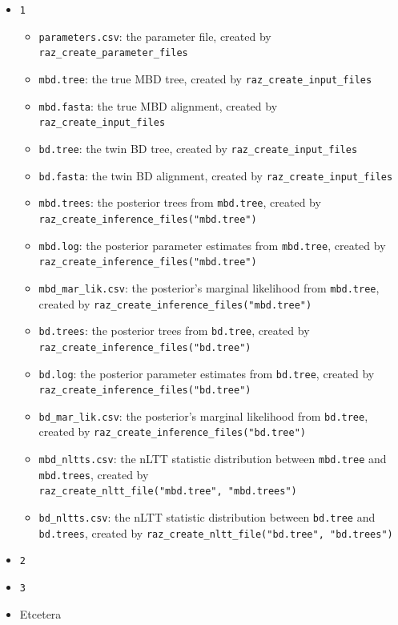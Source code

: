 \documentclass[]{article}
\providecommand{\tightlist}{%
  \setlength{\itemsep}{0pt}\setlength{\parskip}{0pt}}
\begin{document}
\begin{itemize}
\tightlist
\item
  \texttt{1}

  \begin{itemize}
  \tightlist
  \item
    \texttt{parameters.csv}: the parameter file, created by
    \texttt{raz\_create\_parameter\_files}
  \item
    \texttt{mbd.tree}: the true MBD tree, created by
    \texttt{raz\_create\_input\_files}
  \item
    \texttt{mbd.fasta}: the true MBD alignment, created by
    \texttt{raz\_create\_input\_files}
  \item
    \texttt{bd.tree}: the twin BD tree, created by
    \texttt{raz\_create\_input\_files}
  \item
    \texttt{bd.fasta}: the twin BD alignment, created by
    \texttt{raz\_create\_input\_files}
  \item
    \texttt{mbd.trees}: the posterior trees from \texttt{mbd.tree},
    created by \texttt{raz\_create\_inference\_files("mbd.tree")}
  \item
    \texttt{mbd.log}: the posterior parameter estimates from
    \texttt{mbd.tree}, created by
    \texttt{raz\_create\_inference\_files("mbd.tree")}
  \item
    \texttt{mbd\_mar\_lik.csv}: the posterior's marginal likelihood from
    \texttt{mbd.tree}, created by
    \texttt{raz\_create\_inference\_files("mbd.tree")}
  \item
    \texttt{bd.trees}: the posterior trees from \texttt{bd.tree},
    created by \texttt{raz\_create\_inference\_files("bd.tree")}
  \item
    \texttt{bd.log}: the posterior parameter estimates from
    \texttt{bd.tree}, created by
    \texttt{raz\_create\_inference\_files("bd.tree")}
  \item
    \texttt{bd\_mar\_lik.csv}: the posterior's marginal likelihood from
    \texttt{bd.tree}, created by
    \texttt{raz\_create\_inference\_files("bd.tree")}
  \item
    \texttt{mbd\_nltts.csv}: the nLTT statistic distribution between
    \texttt{mbd.tree} and \texttt{mbd.trees}, created by
    \texttt{raz\_create\_nltt\_file("mbd.tree",\ "mbd.trees")}
  \item
    \texttt{bd\_nltts.csv}: the nLTT statistic distribution between
    \texttt{bd.tree} and \texttt{bd.trees}, created by
    \texttt{raz\_create\_nltt\_file("bd.tree",\ "bd.trees")}
  \end{itemize}
\item
  \texttt{2}
\item
  \texttt{3}
\item
  Etcetera
\end{itemize}
\end{document}
